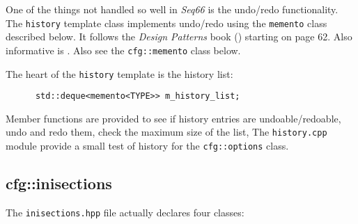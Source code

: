    One of the things not handled so well in \textsl{Seq66} is the
   undo/redo functionality.
   The \texttt{history} template class implements undo/redo using the 
   \texttt{memento} class described below. It follows
   the \textsl{Design Patterns} book (\cite{dpatterns}) starting on page 62.
   Also informative is \cite{deque}.
   Also see the \texttt{cfg::memento} class below.

   The heart of the \texttt{history} template is the history list:

   \begin{verbatim}
      std::deque<memento<TYPE>> m_history_list;
   \end{verbatim}

   Member functions are provided to see if history entries are
   undoable/redoable, undo and redo them, check the maximum size of the list,
   The \texttt{history.cpp} module provide a small test of history for
   the \texttt{cfg::options} class.

\subsection{cfg::inisections}
\label{subsec:cfg_namespace_inisections}

   The \texttt{inisections.hpp} file actually declares four classes:

